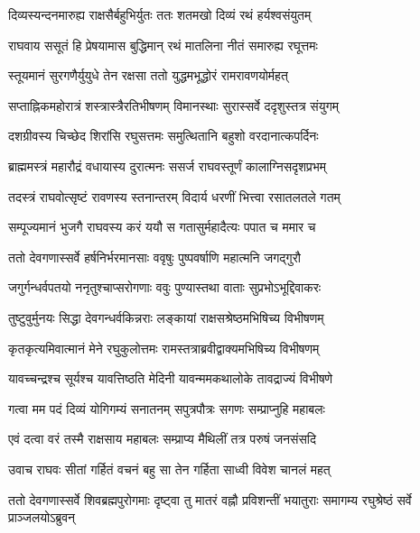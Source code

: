 \twolineshloka
{दिव्यस्यन्दनमारुह्य राक्षसैर्बहुभिर्युतः}
{ततः शतमखो दिव्यं रथं हर्यश्वसंयुतम्}%

\twolineshloka
{राघवाय ससूतं हि प्रेषयामास बुद्धिमान्}
{रथं मातलिना नीतं समारुह्य रघूत्तमः}%

\twolineshloka
{स्तूयमानं सुरगणैर्युयुधे तेन रक्षसा}
{ततो युद्धमभूद्धोरं रामरावणयोर्महत्}%

\twolineshloka
{सप्ताह्निकमहोरात्रं शस्त्रास्त्रैरतिभीषणम्}
{विमानस्थाः सुरास्सर्वे ददृशुस्तत्र संयुगम्}%

\twolineshloka
{दशग्रीवस्य चिच्छेद शिरांसि रघुसत्तमः}
{समुत्थितानि बहुशो वरदानात्कपर्दिनः}%

\twolineshloka
{ब्राह्ममस्त्रं महारौद्रं वधायास्य दुरात्मनः}
{ससर्ज राघवस्तूर्णं कालाग्निसदृशप्रभम्}%

\twolineshloka
{तदस्त्रं राघवोत्सृष्टं रावणस्य स्तनान्तरम्}
{विदार्य धरणीं भित्त्वा रसातलतले गतम्}%

\twolineshloka
{सम्पूज्यमानं भुजगै राघवस्य करं ययौ}
{स गतासुर्महादैत्यः पपात च ममार च}%

\twolineshloka
{ततो देवगणास्सर्वे हर्षनिर्भरमानसाः}
{ववृषुः पुष्पवर्षाणि महात्मनि जगद्गुरौ}%

\twolineshloka
{जगुर्गन्धर्वपतयो ननृतुश्चाप्सरोगणाः}
{ववुः पुण्यास्तथा वाताः सुप्रभोऽभूद्दिवाकरः}%

\twolineshloka
{तुष्टुवुर्मुनयः सिद्धा देवगन्धर्वकिन्नराः}
{लङ्कायां राक्षसश्रेष्ठमभिषिच्य विभीषणम्}%

\twolineshloka
{कृतकृत्यमिवात्मानं मेने रघुकुलोत्तमः}
{रामस्तत्राब्रवीद्वाक्यमभिषिच्य विभीषणम्}%


\twolineshloka
{यावच्चन्द्रश्च सूर्यश्च यावत्तिष्ठति मेदिनी}
{यावन्ममकथालोके तावद्राज्यं विभीषणे}%

\twolineshloka
{गत्वा मम पदं दिव्यं योगिगम्यं सनातनम्}
{सपुत्रपौत्रः सगणः सम्प्राप्नुहि महाबलः}%


\twolineshloka
{एवं दत्वा वरं तस्मै राक्षसाय महाबलः}
{सम्प्राप्य मैथिलीं तत्र परुषं जनसंसदि}%

\twolineshloka
{उवाच राघवः सीतां गर्हितं वचनं बहु}
{सा तेन गर्हिता साध्वी विवेश चानलं महत्}%


\threelineshloka
{ततो देवगणास्सर्वे शिवब्रह्मपुरोगमाः}
{दृष्ट्वा तु मातरं वह्नौ प्रविशन्तीं भयातुराः}
{समागम्य रघुश्रेष्ठं सर्वे प्राञ्जलयोऽब्रुवन्}%


